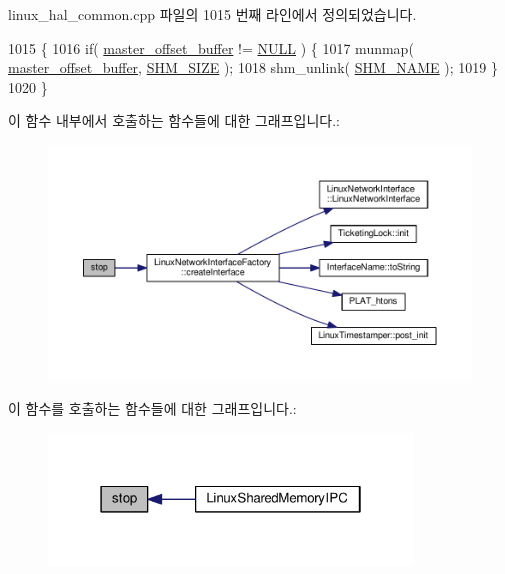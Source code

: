linux\+\_\+hal\+\_\+common.\+cpp 파일의 1015 번째 라인에서 정의되었습니다.


\begin{DoxyCode}
1015                                 \{
1016     \textcolor{keywordflow}{if}( \hyperlink{class_linux_shared_memory_i_p_c_a028459163bd8b988344f6837036cb0be}{master\_offset\_buffer} != \hyperlink{openavb__types__base__pub_8h_a070d2ce7b6bb7e5c05602aa8c308d0c4}{NULL} ) \{
1017         munmap( \hyperlink{class_linux_shared_memory_i_p_c_a028459163bd8b988344f6837036cb0be}{master\_offset\_buffer}, \hyperlink{linux__ipc_8hpp_a16e67aa18d42bbdb08ac9af1c8d0f4f9}{SHM\_SIZE} );
1018         shm\_unlink( \hyperlink{linux__ipc_8hpp_a86393b21e6f74e9870d92149e7fe7f20}{SHM\_NAME} );
1019     \}
1020 \}
\end{DoxyCode}


이 함수 내부에서 호출하는 함수들에 대한 그래프입니다.\+:
\nopagebreak
\begin{figure}[H]
\begin{center}
\leavevmode
\includegraphics[width=350pt]{class_linux_shared_memory_i_p_c_a8c528baf37154d347366083f0f816846_cgraph}
\end{center}
\end{figure}




이 함수를 호출하는 함수들에 대한 그래프입니다.\+:
\nopagebreak
\begin{figure}[H]
\begin{center}
\leavevmode
\includegraphics[width=274pt]{class_linux_shared_memory_i_p_c_a8c528baf37154d347366083f0f816846_icgraph}
\end{center}
\end{figure}


